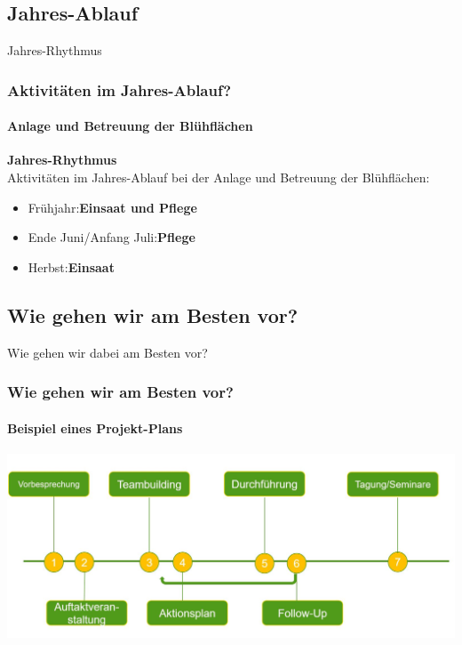 \documentclass[aspectratio=43]{beamer}
\begin{document}
\subsection[Jahr]{Jahres-Ablauf}

\begin{frame}{Jahres-Rhythmus}
\frametitle{Aktivitäten im Jahres-Ablauf?} 
\framesubtitle{Anlage und Betreuung der Blühflächen}

\textbf{Jahres-Rhythmus}\\
Aktivitäten im Jahres-Ablauf bei der Anlage und Betreuung der Blühflächen:

\begin{itemize}
	\item 
	Frühjahr:\pause   \textbf{Einsaat und Pflege}
	 \pause 
	\item 
	Ende Juni/Anfang Juli:\pause    \textbf{Pflege} \pause
	\item 
	Herbst:\pause    \textbf{Einsaat}%

\end{itemize}
\end{frame}


\subsection[Vorgehen]{Wie gehen wir am Besten vor?}

\begin{frame}{Wie gehen wir dabei am Besten vor?}
\frametitle{Wie gehen wir am Besten vor?} 
\framesubtitle{Beispiel eines Projekt-Plans}
\begin{center}
	
\includegraphics[width=1.0\textwidth]{figures/Ablaufschema.JPG}

\end{center}
\end{frame}

\end{document}
